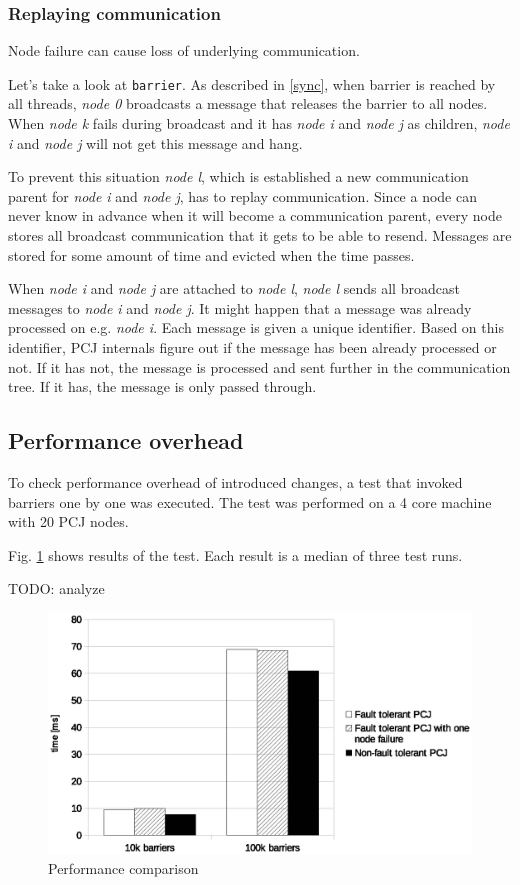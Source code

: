 \documentclass{llncs}
\newcommand{\inlinecode}{\texttt}
\begin{document}
\subsubsection{Replaying communication}
Node failure can cause loss of underlying communication.

Let's take a look at \inlinecode{barrier}.
As described in \ref{sync}, when barrier is reached by all threads, \emph{node 0} broadcasts a message that releases the barrier to all nodes.
When \emph{node k} fails during broadcast and it has \emph{node i} and \emph{node j} as children, \emph{node i} and \emph{node j} will not get this message and hang.

To prevent this situation \emph{node l}, which is established a new communication parent for \emph{node i} and \emph{node j}, has to replay communication.
Since a node can never know in advance when it will become a communication parent, every node stores all broadcast communication that it gets to be able to resend.
Messages are stored for some amount of time and evicted when the time passes.

When \emph{node i} and \emph{node j} are attached to \emph{node l}, \emph{node l} sends all broadcast messages to \emph{node i} and \emph{node j}.
It might happen that a message was already processed on e.g. \emph{node i}.
Each message is given a unique identifier. Based on this identifier, PCJ internals figure out if the message has been already processed or not.
If it has not, the message is processed and sent further in the communication tree. If it has, the message is only passed through.

\subsection{Performance overhead}
To check performance overhead of introduced changes, a test that invoked barriers one by one was executed.
The test was performed on a 4 core machine with 20 PCJ nodes.

Fig. \ref{performance}  shows results of the test.
Each result is a median of three test runs.

TODO: analyze



\begin{figure}
  \centering
      \includegraphics[width=1\textwidth]{barrier-test-chart.eps}
  \caption{Performance comparison}
  \label{performance}
\end{figure}
\end{document}
